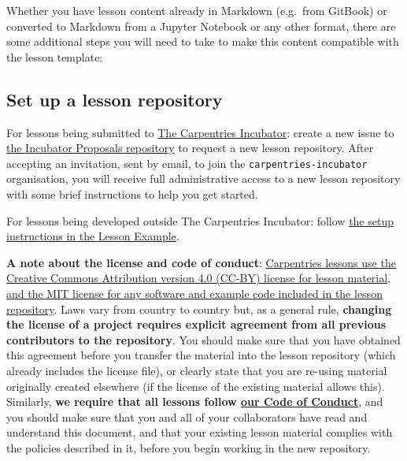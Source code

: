 \documentclass[
]{book}
\begin{document}
Whether you have lesson content already in Markdown (e.g.~from GitBook)
or converted to Markdown from a Jupyter Notebook or any other format,
there are some additional steps you will need to take to make this content
compatible with the lesson template:

\hypertarget{set-up-a-lesson-repository}{%
\subsection{Set up a lesson repository}\label{set-up-a-lesson-repository}}

For lessons being submitted to \href{https://cdh.carpentries.org/the-lesson-life-cycle.html\#where-to-start}{The Carpentries Incubator}:
create a new issue to
\href{https://github.com/carpentries-incubator/proposals}{the Incubator Proposals repository}
to request a new lesson repository.
After accepting an invitation, sent by email,
to join the \texttt{carpentries-incubator} organisation,
you will receive full administrative access to a new lesson repository
with some brief instructions to help you get started.

For lessons being developed outside The Carpentries Incubator:
follow \href{https://carpentries.github.io/lesson-example/setup.html}{the setup instructions in the Lesson Example}.

\textbf{A note about the license and code of conduct}:
\href{https://github.com/carpentries/styles/blob/gh-pages/LICENSE.md}{Carpentries lessons use the Creative Commons Attribution version 4.0 (CC-BY) license for lesson material, and the MIT license for any software and example code included in the lesson repository}.
Laws vary from country to country but,
as a general rule,
\textbf{changing the license of a project requires explicit agreement}
\textbf{from all previous contributors to the repository}.
You should make sure that you have obtained this agreement
before you transfer the material
into the lesson repository (which already includes the license file),
or clearly state that you are re-using material originally created elsewhere
(if the license of the existing material allows this).
Similarly, \textbf{we require that all lessons follow \href{https://docs.carpentries.org/topic_folders/policies/code-of-conduct.html}{our Code of Conduct}},
and you should make sure that you and all of your collaborators have read and
understand this document, and that your existing lesson material complies with
the policies described in it, before you begin working in the new repository.
\end{document}
